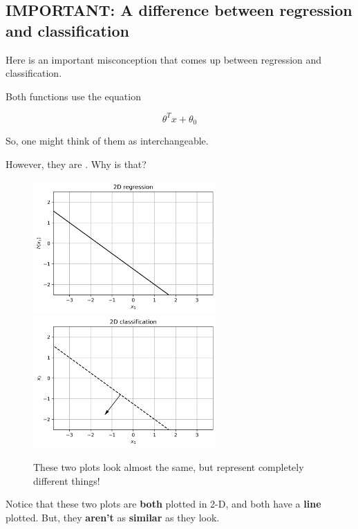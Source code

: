 \subsection*{IMPORTANT: A difference between regression and classification}

    Here is an important misconception that comes up between regression and classification.
    
    Both functions use the equation
    
    \begin{equation}
        \theta^T x + \theta_0
    \end{equation}
    
    So, one might think of them as interchangeable.
    
    However, they are . Why is that?
    
    \begin{figure}[H]

        
        \includegraphics[width=70mm,scale=0.5]{images/classification_images/2d_regression_versus.png}
        \includegraphics[width=70mm,scale=0.5]{images/classification_images/2d_classification_versus.png}

        \caption*{These two plots look almost the same, but represent completely different things!}
    \end{figure}
    
    Notice that these two plots are \textbf{both} plotted in 2-D, and both have a \textbf{line} plotted. But, they \textbf{aren't} as \textbf{similar} as they look. 
    
